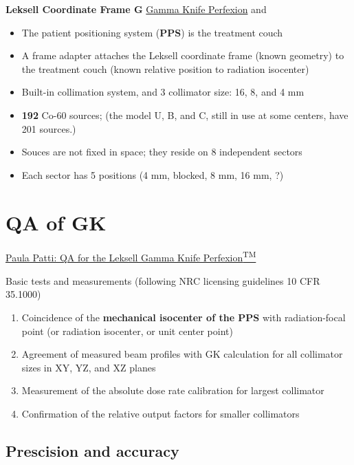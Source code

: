 \documentclass[]{book}
\providecommand{\tightlist}{%
  \setlength{\itemsep}{0pt}\setlength{\parskip}{0pt}}
\theoremstyle{definition}
\theoremstyle{definition}
\theoremstyle{definition}
\theoremstyle{remark}
\begin{document}
\textbf{Leksell Coordinate Frame G}
\href{https://www.youtube.com/watch?v=90vD3cxc9m0}{Gamma Knife
Perfexion} and

\begin{itemize}
\tightlist
\item
  The patient positioning system (\textbf{PPS}) is the treatment couch
\item
  A frame adapter attaches the Leksell coordinate frame (known geometry)
  to the treatment couch (known relative position to radiation
  isocenter)
\item
  Built-in collimation system, and 3 collimator size: 16, 8, and 4 mm
\item
  \textbf{192} Co-60 sources; (the model U, B, and C, still in use at
  some centers, have 201 sources.)
\item
  Souces are not fixed in space; they reside on 8 independent sectors
\item
  Each sector has 5 positions (4 mm, blocked, 8 mm, 16 mm, ?)
\end{itemize}

\section{QA of GK}\label{qa-of-gk}

\href{https://vimeo.com/88176011}{Paula Patti: QA for the Leksell Gamma
Knife Perfexion\textsuperscript{TM}}

Basic tests and measurements (following NRC licensing guidelines 10 CFR
35.1000)

\begin{enumerate}
\def\labelenumi{\arabic{enumi}.}
\tightlist
\item
  Coincidence of the \textbf{mechanical isocenter of the PPS} with
  radiation-focal point (or radiation isocenter, or unit center point)
\item
  Agreement of measured beam profiles with GK calculation for all
  collimator sizes in XY, YZ, and XZ planes
\item
  Measurement of the absolute dose rate calibration for largest
  collimator
\item
  Confirmation of the relative output factors for smaller collimators
\end{enumerate}

\subsection{Prescision and accuracy}\label{prescision-and-accuracy}
\end{document}
